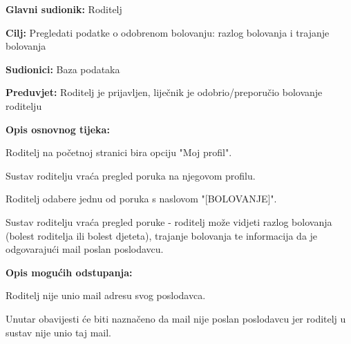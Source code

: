 					
					
					\noindent {}
					\begin{packed_item}
						
						\item \textbf{Glavni sudionik: }Roditelj
						\item  \textbf{Cilj:} Pregledati podatke o odobrenom bolovanju: razlog bolovanja i trajanje bolovanja
						\item  \textbf{Sudionici:} Baza podataka
						\item  \textbf{Preduvjet:} Roditelj je prijavljen, liječnik je odobrio/preporučio bolovanje roditelju
						\item  \textbf{Opis osnovnog tijeka:}
						
						\item[] \begin{packed_enum}
							
							\item Roditelj na početnoj stranici bira opciju "Moj profil".
							\item Sustav roditelju vraća pregled poruka na njegovom profilu.
							\item Roditelj odabere jednu od poruka s naslovom "[BOLOVANJE]".
							\item Sustav roditelju vraća pregled poruke - roditelj može vidjeti razlog bolovanja (bolest roditelja ili bolest djeteta), trajanje bolovanja te informacija da je odgovarajući mail poslan poslodavcu.
						\end{packed_enum}
						
						\item  \textbf{Opis mogućih odstupanja:}
						
						\item[] \begin{packed_item}
							
							\item[4.a] Roditelj nije unio mail adresu svog poslodavca.
							\item[] \begin{packed_enum}
								
								\item Unutar obavijesti će biti naznačeno da mail nije poslan poslodavcu jer roditelj u sustav nije unio taj mail.
							\end{packed_enum}
							
							
						\end{packed_item}
					\end{packed_item}
					
